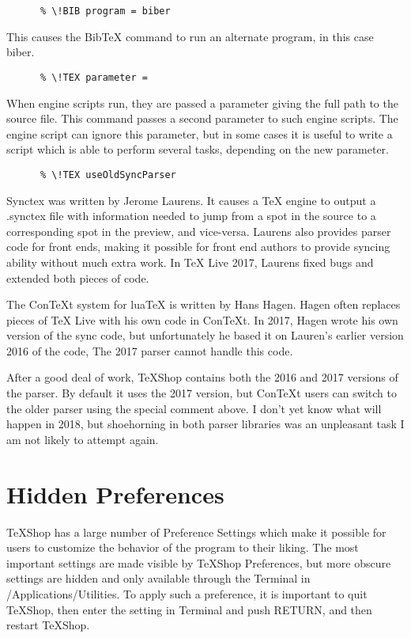 \documentclass[11pt, oneside]{article}   	%
\begin{document}
  \begin{verbatim}
      % \!BIB program = biber
 \end{verbatim}
 This causes the BibTeX command to run an alternate program, in this case biber.    
  
  \begin{verbatim}
      % \!TEX parameter = 
 \end{verbatim}
When engine scripts run, they are passed a parameter giving the full path to the source file. This command passes a second parameter to such engine scripts. The engine script can ignore this parameter, but in some cases it is useful to write a script which is able to perform several tasks, depending on the new parameter.  
     
  \begin{verbatim}
      % \!TEX useOldSyncParser
 \end{verbatim}
Synctex was written by Jerome Laurens. It causes a TeX engine to output a .synctex file with information needed to jump from a spot in the source to a corresponding spot in the preview, and vice-versa. Laurens also provides parser code for front ends, making it possible for front end authors to provide syncing ability without much extra work. In TeX Live 2017, Laurens fixed bugs and extended both pieces of code.

The ConTeXt system for luaTeX is written by Hans Hagen. Hagen often replaces pieces of TeX Live with his own code in ConTeXt. In 2017, Hagen wrote his own version of the sync code, but unfortunately he based it on Lauren's earlier version 2016 of the code, The 2017 parser cannot handle this code.

After a good deal of work, TeXShop contains both the 2016 and 2017 versions of the parser. By default it uses the 2017 version, but ConTeXt users can switch to the older parser using the special comment above. I don't yet know what will happen in 2018, but shoehorning in both parser libraries was an unpleasant task I am not likely to attempt again.

\newpage
\section{Hidden Preferences}
TeXShop has a large number of Preference Settings which make it possible for users to customize the behavior of the program to their liking. The most important settings are made visible by TeXShop Preferences, but more obscure settings are hidden and only available through the Terminal in /Applications/Utilities. To apply such a preference, it is important to quit TeXShop, then enter the setting in Terminal and push RETURN, and then restart TeXShop. 
\end{document}

